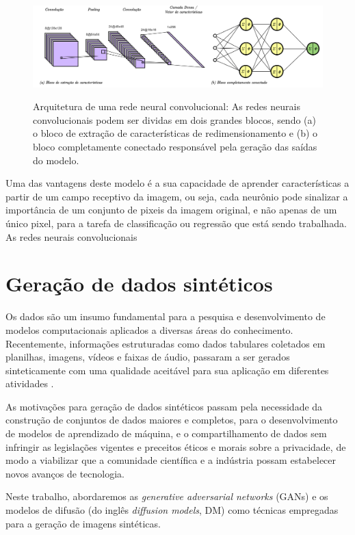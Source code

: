 \begin{figure}[htbp]
	\centering
	\caption{Arquitetura de uma rede neural convolucional: As redes neurais convolucionais podem ser dividas em dois grandes blocos, sendo (a) o bloco de extração de características de redimensionamento e (b) o bloco completamente conectado responsável pela geração das saídas do modelo.}
		\includegraphics[scale=.23]{imagens/cnn.png}
	\label{fig:cnn}
\end{figure}

Uma das vantagens deste modelo é a sua capacidade de aprender características a partir de um campo receptivo da imagem, ou seja, cada neurônio pode sinalizar a importância de um conjunto de pixeis da imagem original, e não apenas de um único pixel, para a tarefa de classificação ou regressão que está sendo trabalhada. As redes neurais convolucionais

\section{Geração de dados sintéticos}

Os dados são um insumo fundamental para a pesquisa e desenvolvimento de modelos computacionais aplicados a diversas áreas do conhecimento. Recentemente, informações estruturadas como dados tabulares coletados em planilhas, imagens, vídeos e faixas de áudio, passaram a ser gerados sinteticamente com uma qualidade aceitável para sua aplicação em diferentes atividades \cite{dhariwalDiffusionModelsBeat2021}.

As motivações para geração de dados sintéticos passam pela necessidade da construção de conjuntos de dados maiores e completos, para o desenvolvimento de modelos de aprendizado de máquina, e o compartilhamento de dados sem infringir as legislações vigentes e preceitos éticos e morais sobre a privacidade, de modo a viabilizar que a comunidade científica e a indústria possam estabelecer novos avanços de tecnologia.

Neste trabalho, abordaremos as \textit{generative adversarial networks} (GANs) e os modelos de difusão (do inglês \textit{diffusion models}, DM) como técnicas empregadas para a geração de imagens sintéticas.


